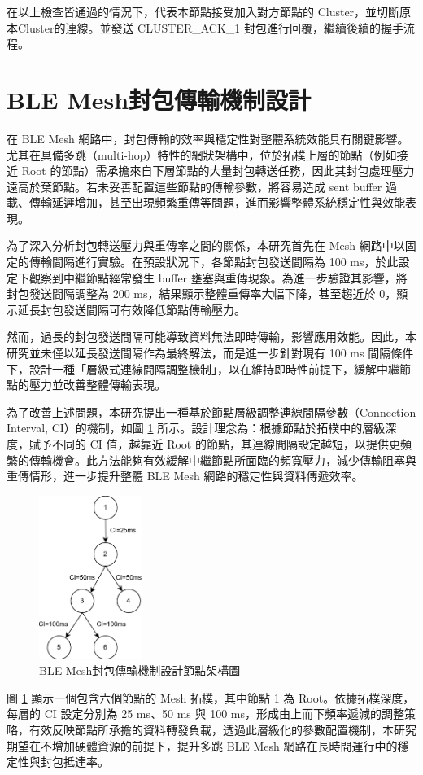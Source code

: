 \begin{ZhChapter}
在以上檢查皆通過的情況下，代表本節點接受加入對方節點的 Cluster，並切斷原本Cluster的連線。並發送 CLUSTER\_ACK\_1 封包進行回覆，繼續後續的握手流程。

\section{BLE Mesh封包傳輸機制設計}
在 BLE Mesh 網路中，封包傳輸的效率與穩定性對整體系統效能具有關鍵影響。尤其在具備多跳（multi-hop）特性的網狀架構中，位於拓樸上層的節點（例如接近 Root 的節點）需承擔來自下層節點的大量封包轉送任務，因此其封包處理壓力遠高於葉節點。若未妥善配置這些節點的傳輸參數，將容易造成 sent buffer 過載、傳輸延遲增加，甚至出現頻繁重傳等問題，進而影響整體系統穩定性與效能表現。

為了深入分析封包轉送壓力與重傳率之間的關係，本研究首先在 Mesh 網路中以固定的傳輸間隔進行實驗。在預設狀況下，各節點封包發送間隔為 100 ms，於此設定下觀察到中繼節點經常發生 buffer 壅塞與重傳現象。為進一步驗證其影響，將封包發送間隔調整為 200 ms，結果顯示整體重傳率大幅下降，甚至趨近於 0，顯示延長封包發送間隔可有效降低節點傳輸壓力。

然而，過長的封包發送間隔可能導致資料無法即時傳輸，影響應用效能。因此，本研究並未僅以延長發送間隔作為最終解法，而是進一步針對現有 100 ms 間隔條件下，設計一種「層級式連線間隔調整機制」，以在維持即時性前提下，緩解中繼節點的壓力並改善整體傳輸表現。

為了改善上述問題，本研究提出一種基於節點層級調整連線間隔參數（Connection Interval, CI）的機制，如圖 \ref{fig: BLE Mesh封包傳輸機制設計節點架構圖} 所示。設計理念為：根據節點於拓樸中的層級深度，賦予不同的 CI 值，越靠近 Root 的節點，其連線間隔設定越短，以提供更頻繁的傳輸機會。此方法能夠有效緩解中繼節點所面臨的頻寬壓力，減少傳輸阻塞與重傳情形，進一步提升整體 BLE Mesh 網路的穩定性與資料傳遞效率。

\begin{figure}[H]
    \centering
    \includegraphics[width = 0.3\textwidth]{image/BLE Mesh封包傳輸機制設計節點架構圖.png}
    \caption{BLE Mesh封包傳輸機制設計節點架構圖}
    \label{fig: BLE Mesh封包傳輸機制設計節點架構圖}
\end{figure}

圖 \ref{fig: BLE Mesh封包傳輸機制設計節點架構圖} 顯示一個包含六個節點的 Mesh 拓樸，其中節點 1 為 Root。依據拓樸深度，每層的 CI 設定分別為 25 ms、50 ms 與 100 ms，形成由上而下頻率遞減的調整策略，有效反映節點所承擔的資料轉發負載，透過此層級化的參數配置機制，本研究期望在不增加硬體資源的前提下，提升多跳 BLE Mesh 網路在長時間運行中的穩定性與封包抵達率。

\end{ZhChapter}